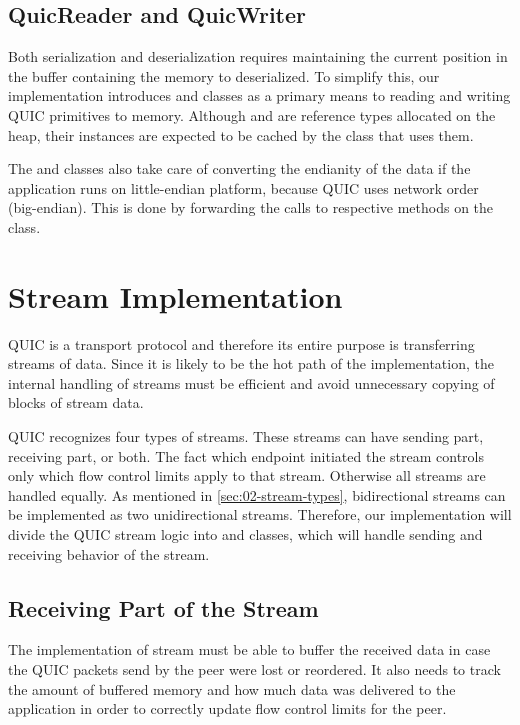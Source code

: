 \subsection{QuicReader and QuicWriter}

Both serialization and deserialization requires maintaining the current position in the buffer
containing the memory to deserialized. To simplify this, our implementation introduces \QuicReader{}
and \QuicWriter{} classes as a primary means to reading and writing QUIC primitives to memory.
Although \QuicReader{} and \QuicWriter{} are reference types allocated on the heap, their instances
are expected to be cached by the class that uses them.

The \QuicReader{} and \QuicWriter{} classes also take care of converting the endianity of the data
if the application runs on little-endian platform, because QUIC uses network order (big-endian). This is done by forwarding the calls to respective methods on the  class.

\section{Stream Implementation}

QUIC is a transport protocol and therefore its entire purpose is transferring streams of data. Since
it is likely to be the hot path of the implementation, the internal handling of streams must be
efficient and avoid unnecessary copying of blocks of stream data.

QUIC recognizes four types of streams. These streams can have sending part, receiving part, or both.
The fact which endpoint initiated the stream controls only which flow control limits apply to that
stream. Otherwise all streams are handled equally. As mentioned in \autoref{sec:02-stream-types},
bidirectional streams can be implemented as two unidirectional streams. Therefore, our
implementation will divide the QUIC stream logic into \SendStream{} and \ReceiveStream{} classes,
which will handle sending and receiving behavior of the stream.

\subsection{Receiving Part of the Stream}

The implementation of \ReceiveStream{} stream must be able to buffer the received data in case the
QUIC packets send by the peer were lost or reordered. It also needs to track the amount of buffered
memory and how much data was delivered to the application in order to correctly update flow control
limits for the peer.

